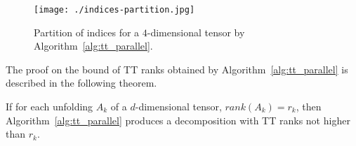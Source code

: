 \documentclass[runningheads]{llncs}
\begin{document}
\begin{figure}[htb]
	\begin{center}
		\texttt{[image: ./indices-partition.jpg]}
	\end{center}
	\caption{\label{fig:4dindices} Partition of indices for a $4$-dimensional tensor by Algorithm~\ref{alg:tt_parallel}.} 
\end{figure}

\noindent The proof on the bound of TT ranks obtained by Algorithm~\ref{alg:tt_parallel} is described in the following theorem.

\begin{theorem}
	If for each unfolding $A_k$ of a $d$-dimensional tensor, $rank(A_k)=r_k$, then Algorithm~\ref{alg:tt_parallel} produces a decomposition with TT ranks not higher than $r_k$.
\end{theorem}
\end{document}
